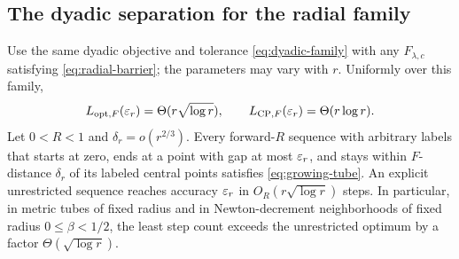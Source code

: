\subsection{The dyadic separation for the radial family}
\begin{corollary}
\label{cor:radial-discrete}
Use the same dyadic objective and tolerance \eqref{eq:dyadic-family}
with any $F_{\lambda,c}$ satisfying \eqref{eq:radial-barrier};
the parameters may vary with $r$. Uniformly over this family,
\[
 L_{\mathrm{opt},F}(\varepsilon_r)=\Theta(r\sqrt{\log r}),\qquad
 L_{\mathrm{CP},F}(\varepsilon_r)=\Theta(r\log r).
\]
Let $0<R<1$ and $\delta_r=o(r^{2/3})$. Every forward-$R$ sequence
with arbitrary labels that starts at zero, ends at a point with gap at
most $\varepsilon_r$, and stays within $F$-distance $\delta_r$ of its labeled
central points satisfies \eqref{eq:growing-tube}. An explicit
unrestricted sequence reaches accuracy $\varepsilon_r$ in
$O_R(r\sqrt{\log r})$ steps. In particular, in metric tubes of fixed
radius and in Newton-decrement neighborhoods of fixed radius
$0\leq\beta<1/2$, the least step count exceeds the unrestricted
optimum by a factor $\Theta(\sqrt{\log r})$.
\end{corollary}
